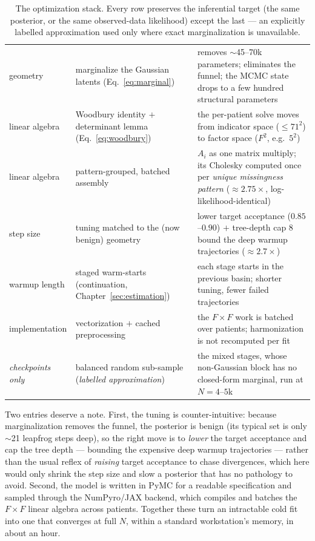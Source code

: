 \begin{table}[h]\centering\small\sffamily
\caption{The optimization stack. Every row preserves the inferential target (the same posterior, or the same
observed-data likelihood) except the last --- an explicitly labelled approximation used only where exact
marginalization is unavailable.}
\label{tab:speedups}
\begin{tabular}{L{2.7cm} L{6.1cm} L{5.0cm}}
\toprule
{} &  & \\
\midrule
{} geometry & marginalize the Gaussian latents (Eq.~\ref{eq:marginal}) & removes $\sim$45--70k parameters; eliminates the funnel; the MCMC state drops to a few hundred structural parameters\\
linear algebra & Woodbury identity $+$ determinant lemma (Eq.~\ref{eq:woodbury}) & the per-patient solve moves from indicator space ($\le 71^2$) to factor space ($F^2$, e.g.\ $5^2$)\\
 linear algebra & pattern-grouped, batched assembly & $A_i$ as one matrix multiply; its Cholesky computed once per \emph{unique missingness pattern} ($\approx 2.75\times$, log-likelihood-identical)\\
step size & tuning matched to the (now benign) geometry & lower target acceptance ($0.85$--$0.90$) $+$ tree-depth cap $8$ bound the deep warmup trajectories ($\approx 2.7\times$)\\
 warmup length & staged warm-starts (continuation, Chapter~\ref{sec:estimation}) & each stage starts in the previous basin; shorter tuning, fewer failed trajectories\\
implementation & vectorization $+$ cached preprocessing & the $F\times F$ work is batched over patients; harmonization is not recomputed per fit\\
\midrule
{} \emph{checkpoints only} & balanced random sub-sample (\emph{labelled approximation}) & the mixed stages, whose non-Gaussian block has no closed-form marginal, run at $N=4$--$5$k\\
\bottomrule
\end{tabular}
\end{table}

Two entries deserve a note. First, the tuning is counter-intuitive: because marginalization removes the funnel,
the posterior is benign (its typical set is only $\sim$21 leapfrog steps deep), so the right move is to
\emph{lower} the target acceptance and cap the tree depth --- bounding the expensive deep warmup trajectories
--- rather than the usual reflex of \emph{raising} target acceptance to chase divergences, which here would only
shrink the step size and slow a posterior that has no pathology to avoid. Second, the model is written in PyMC
for a readable specification and sampled through the NumPyro/JAX backend, which compiles and batches the
$F\times F$ linear algebra across patients. Together these turn an intractable cold fit into one that converges
at full $N$, within a standard workstation's memory, in about an hour.

